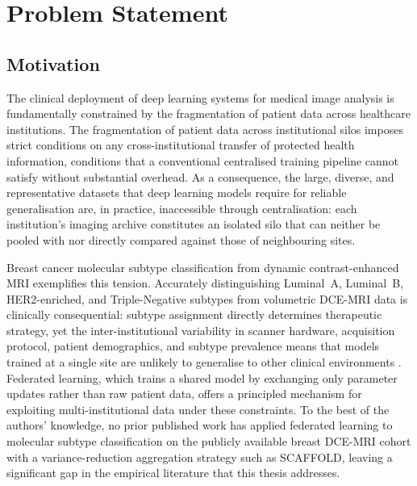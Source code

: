 \chapter{Problem Statement}
\label{chap:problem-statement}

\section{Motivation}
\label{sec:motivation}

The clinical deployment of deep learning systems for medical image analysis is
fundamentally constrained by the fragmentation of patient data across healthcare
institutions.
The fragmentation of patient data across institutional silos imposes strict
conditions on any cross-institutional transfer of protected health information,
conditions that a conventional centralised training pipeline cannot satisfy
without substantial overhead.
As a consequence, the large, diverse, and representative datasets that deep
learning models require for reliable generalisation are, in practice, inaccessible
through centralisation: each institution's imaging archive constitutes an isolated
silo that can neither be pooled with nor directly compared against those of
neighbouring sites.

Breast cancer molecular subtype classification from dynamic contrast-enhanced MRI
exemplifies this tension.
Accurately distinguishing Luminal~A, Luminal~B, HER2-enriched, and Triple-Negative
subtypes from volumetric DCE-MRI data is clinically consequential: subtype
assignment directly determines therapeutic strategy, yet the inter-institutional
variability in scanner hardware, acquisition protocol, patient demographics, and
subtype prevalence means that models trained at a single site are unlikely to
generalise to other clinical environments \cite{ghosh2020clustered}.
Federated learning, which trains a shared model by exchanging only parameter
updates rather than raw patient data, offers a principled mechanism for exploiting
multi-institutional data under these constraints.
To the best of the authors' knowledge, no prior published work has applied federated
learning to molecular subtype classification on the publicly available breast
DCE-MRI cohort \cite{alves2023breastmri} with a variance-reduction aggregation
strategy such as SCAFFOLD, leaving a significant gap in the empirical literature
that this thesis addresses.

